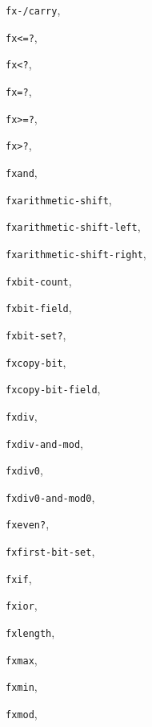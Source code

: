 {\begin{multicols}{2}
\texttt{fx-/carry}, \textit{\pageref{objects_s162}}
  
\texttt{fx\textless{}=?}, \textit{\pageref{objects_s153}}
  
\texttt{fx\textless{}?}, \textit{\pageref{objects_s153}}
  
\texttt{fx=?}, \textit{\pageref{objects_s153}}
  
\texttt{fx\textgreater{}=?}, \textit{\pageref{objects_s153}}
  
\texttt{fx\textgreater{}?}, \textit{\pageref{objects_s153}}
  
\texttt{fxand}, \textit{\pageref{objects_s163}}
  
\texttt{fxarithmetic-shift}, \textit{\pageref{objects_s173}}
  
\texttt{fxarithmetic-shift-left}, \textit{\pageref{objects_s172}}
  
\texttt{fxarithmetic-shift-right}, \textit{\pageref{objects_s172}}
  
\texttt{fxbit-count}, \textit{\pageref{objects_s165}}
  
\texttt{fxbit-field}, \textit{\pageref{objects_s170}}
  
\texttt{fxbit-set?}, \textit{\pageref{objects_s168}}
  
\texttt{fxcopy-bit}, \textit{\pageref{objects_s169}}
  
\texttt{fxcopy-bit-field}, \textit{\pageref{objects_s171}}
  
\texttt{fxdiv}, \textit{\pageref{objects_s160}}
  
\texttt{fxdiv-and-mod}, \textit{\pageref{objects_s160}}
  
\texttt{fxdiv0}, \textit{\pageref{objects_s161}}
  
\texttt{fxdiv0-and-mod0}, \textit{\pageref{objects_s161}}
  
\texttt{fxeven?}, \textit{\pageref{objects_s155}}
  
\texttt{fxfirst-bit-set}, \textit{\pageref{objects_s167}}
  
\texttt{fxif}, \textit{\pageref{objects_s164}}
  
\texttt{fxior}, \textit{\pageref{objects_s163}}
  
\texttt{fxlength}, \textit{\pageref{objects_s166}}
  
\texttt{fxmax}, \textit{\pageref{objects_s156}}
  
\texttt{fxmin}, \textit{\pageref{objects_s156}}
  
\texttt{fxmod}, \textit{\pageref{objects_s160}}
  

\end{multicols}}
